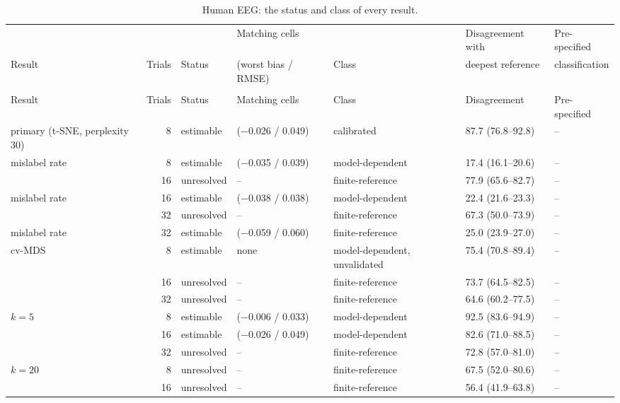 \documentclass[11pt]{article}
\renewcommand{\thetable}{S\arabic{table}}
\begin{document}
{\scriptsize\setlength{\tabcolsep}{4pt}
\begin{longtable}{>{\raggedright\arraybackslash}p{3.0cm}rl>{\raggedright\arraybackslash}p{2.3cm}>{\raggedright\arraybackslash}p{2.1cm}ll}
\caption{Human EEG: the status and class of every result.}\\
\toprule
 & & & Matching cells & & Disagreement with & Pre-specified \\
Result & Trials & Status & (worst bias / RMSE) & Class & deepest reference & classification \\
\midrule
\endfirsthead
\multicolumn{7}{l}{\textit{Table~\thetable, continued}} \\
\toprule
Result & Trials & Status & Matching cells & Class & Disagreement & Pre-specified \\
\midrule
\endhead
\bottomrule
\endfoot
primary (t-SNE, perplexity 30) & 8 & estimable & 3 ($-$0.026 / 0.049) & calibrated & 87.7 (76.8--92.8) & -- \\
\quad mislabel rate & 8 & estimable & 8 ($-$0.035 / 0.039) & model-dependent & 17.4 (16.1--20.6) & -- \\
 & 16 & unresolved & -- & finite-reference & 77.9 (65.6--82.7) & -- \\
\quad mislabel rate & 16 & estimable & 6 ($-$0.038 / 0.038) & model-dependent & 22.4 (21.6--23.3) & -- \\
 & 32 & unresolved & -- & finite-reference & 67.3 (50.0--73.9) & -- \\
\quad mislabel rate & 32 & estimable & 6 ($-$0.059 / 0.060) & finite-reference & 25.0 (23.9--27.0) & -- \\
\addlinespace
cv-MDS & 8 & estimable & none & model-dependent, unvalidated & 75.4 (70.8--89.4) & -- \\
 & 16 & unresolved & -- & finite-reference & 73.7 (64.5--82.5) & -- \\
 & 32 & unresolved & -- & finite-reference & 64.6 (60.2--77.5) & -- \\
\addlinespace
$k=5$ & 8 & estimable & 1 ($-$0.006 / 0.033) & model-dependent & 92.5 (83.6--94.9) & -- \\
 & 16 & estimable & 2 ($-$0.026 / 0.049) & model-dependent & 82.6 (71.0--88.5) & -- \\
 & 32 & unresolved & -- & finite-reference & 72.8 (57.0--81.0) & -- \\
\addlinespace
$k=20$ & 8 & unresolved & -- & finite-reference & 67.5 (52.0--80.6) & -- \\
 & 16 & unresolved & -- & finite-reference & 56.4 (41.9--63.8) & -- \\

\end{longtable}}
\end{document}
